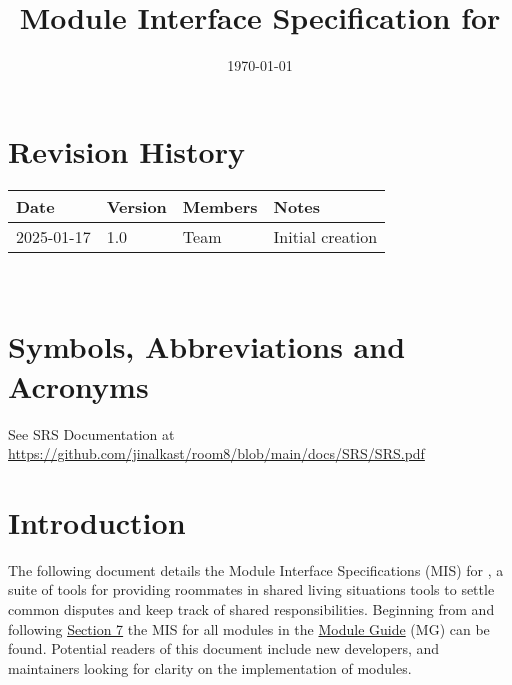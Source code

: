 \documentclass[12pt, titlepage]{article}
\begin{document}
\title{Module Interface Specification for \progname{}}

\author{\authname}

\date{\today}

\maketitle


\section{Revision History}

\begin{tabularx}{\textwidth}{p{3cm}p{2cm}p{4cm}X}
\toprule {\bf Date} & {\bf Version} & {\bf Members} & {\bf Notes}\\
\midrule
2025-01-17 & 1.0 & Team &Initial creation\\
\bottomrule
\end{tabularx}

~\newpage

\section{Symbols, Abbreviations and Acronyms}

See SRS Documentation at \url{https://github.com/jinalkast/room8/blob/main/docs/SRS/SRS.pdf}

\newpage

\tableofcontents

\newpage


\section{Introduction}

The following document details the Module Interface Specifications (MIS) for
\progname{}, a suite of tools for providing roommates in shared living situations tools to settle common disputes and keep track of shared responsibilities. Beginning from and following \hyperref[Start]{Section 7} the MIS for all modules in the \href{https://github.com/jinalkast/room8/tree/main/docs/Design/SoftArchitecture}{Module Guide} (MG) can be found. Potential readers of this document include new developers, and maintainers looking for clarity on the implementation of modules.\\
\end{document}
